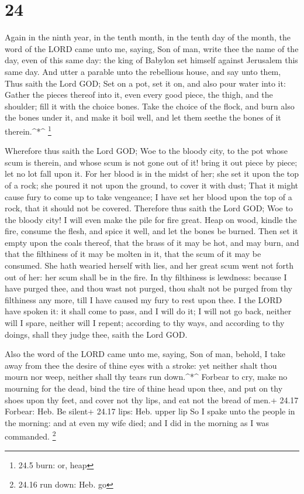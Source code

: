 \hypertarget{section-23}{%
\section{24}\label{section-23}}

 Again in the ninth year, in the tenth month, in the tenth
day of the month, the word of the LORD came unto me, saying,
 Son of man, write thee the name of the day, even of this
same day: the king of Babylon set himself against Jerusalem this same
day.  And utter a parable unto the rebellious house, and say
unto them, Thus saith the Lord GOD; Set on a pot, set it on, and also
pour water into it:  Gather the pieces thereof into it, even
every good piece, the thigh, and the shoulder; fill it with the choice
bones.  Take the choice of the flock, and burn also the
bones under it, and make it boil well, and let them seethe the bones of
it therein.\^{}*\^{} \footnote{24.5 burn: or, heap}

 Wherefore thus saith the Lord GOD; Woe to the bloody city,
to the pot whose scum is therein, and whose scum is not gone out of it!
bring it out piece by piece; let no lot fall upon it.  For
her blood is in the midst of her; she set it upon the top of a rock; she
poured it not upon the ground, to cover it with dust;  That
it might cause fury to come up to take vengeance; I have set her blood
upon the top of a rock, that it should not be covered. 
Therefore thus saith the Lord GOD; Woe to the bloody city! I will even
make the pile for fire great.  Heap on wood, kindle the
fire, consume the flesh, and spice it well, and let the bones be burned.
 Then set it empty upon the coals thereof, that the brass
of it may be hot, and may burn, and that the filthiness of it may be
molten in it, that the scum of it may be consumed.  She
hath wearied herself with lies, and her great scum went not forth out of
her: her scum shall be in the fire.  In thy filthiness is
lewdness: because I have purged thee, and thou wast not purged, thou
shalt not be purged from thy filthiness any more, till I have caused my
fury to rest upon thee.  I the LORD have spoken it: it
shall come to pass, and I will do it; I will not go back, neither will I
spare, neither will I repent; according to thy ways, and according to
thy doings, shall they judge thee, saith the Lord GOD.

 Also the word of the LORD came unto me, saying,
 Son of man, behold, I take away from thee the desire of
thine eyes with a stroke: yet neither shalt thou mourn nor weep, neither
shall thy tears run down.\^{}*\^{}  Forbear to cry, make no
mourning for the dead, bind the tire of thine head upon thee, and put on
thy shoes upon thy feet, and cover not thy lips, and eat not the bread
of men.+ 24.17 Forbear: Heb. Be silent+ 24.17 lips: Heb. upper lip
 So I spake unto the people in the morning: and at even my
wife died; and I did in the morning as I was commanded. \footnote{24.16
  run down: Heb. go}

